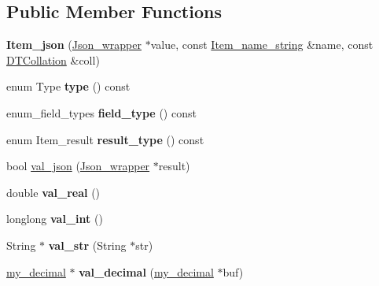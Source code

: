 \subsection*{Public Member Functions}
\begin{DoxyCompactItemize}
\item 
\mbox{\label{classItem__json_a753a264fb2579cbf13a70636e1e5184c}} 
{\bfseries Item\+\_\+json} (\mbox{\hyperlink{classJson__wrapper}{Json\+\_\+wrapper}} $\ast$value, const \mbox{\hyperlink{classItem__name__string}{Item\+\_\+name\+\_\+string}} \&name, const \mbox{\hyperlink{classDTCollation}{D\+T\+Collation}} \&coll)
\item 
\mbox{\label{classItem__json_afffb55dbece21392eb96ee649bc35496}} 
enum Type {\bfseries type} () const
\item 
\mbox{\label{classItem__json_a82aef74b0f842f38a4af925bace42e14}} 
enum\+\_\+field\+\_\+types {\bfseries field\+\_\+type} () const
\item 
\mbox{\label{classItem__json_a3d95f2484006e350e735568bc76690e5}} 
enum Item\+\_\+result {\bfseries result\+\_\+type} () const
\item 
bool \mbox{\hyperlink{classItem__json_a002a9253bafc524798d5bc2e5ee1a3d9}{val\+\_\+json}} (\mbox{\hyperlink{classJson__wrapper}{Json\+\_\+wrapper}} $\ast$result)
\item 
\mbox{\label{classItem__json_ab06aa6a16185a4d16479a8c31802c4de}} 
double {\bfseries val\+\_\+real} ()
\item 
\mbox{\label{classItem__json_a117745e465495bca08fac5c4036a2683}} 
longlong {\bfseries val\+\_\+int} ()
\item 
\mbox{\label{classItem__json_a35b1226eed42963b0794bd611555dcae}} 
String $\ast$ {\bfseries val\+\_\+str} (String $\ast$str)
\item 
\mbox{\label{classItem__json_aedd21edf141d198f5af2dc41b181607e}} 
\mbox{\hyperlink{classmy__decimal}{my\+\_\+decimal}} $\ast$ {\bfseries val\+\_\+decimal} (\mbox{\hyperlink{classmy__decimal}{my\+\_\+decimal}} $\ast$buf)
\item 

\end{DoxyCompactItemize}
